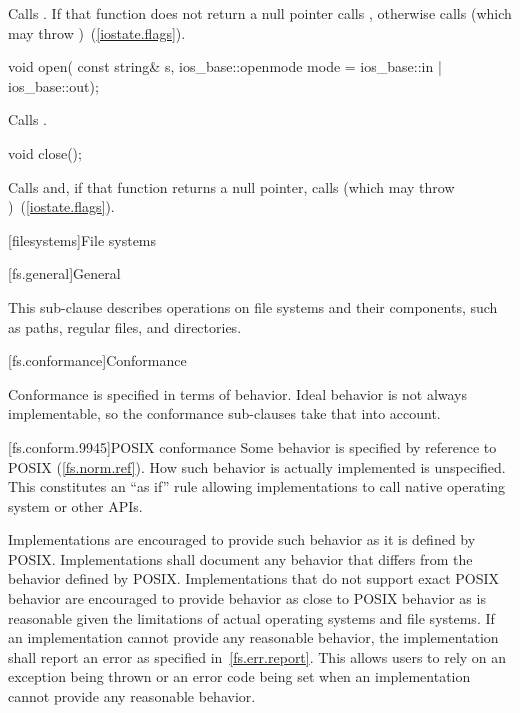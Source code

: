 \begin{itemdescr}
\pnum
\effects
Calls
.
If that function does not return a null pointer calls ,
otherwise calls
(which may throw
)~(\ref{iostate.flags}).
\end{itemdescr}

%
\begin{itemdecl}
void open(
  const string& s,
  ios_base::openmode mode = ios_base::in | ios_base::out);
\end{itemdecl}

\begin{itemdescr}
\pnum
\effects Calls .
\end{itemdescr}

%
\begin{itemdecl}
void close();
\end{itemdecl}

\begin{itemdescr}
\pnum
\effects
Calls
and, if that function
returns a null pointer,
calls
(which may throw
)~(\ref{iostate.flags}).
\end{itemdescr}

[filesystems]{File systems}

[fs.general]{General}

\pnum
This sub-clause describes operations on file systems and their components, such as paths,
regular files, and directories.

[fs.conformance]{Conformance}

\pnum
Conformance is specified in terms of behavior. Ideal behavior is not always
implementable, so the conformance sub-clauses take that into account.

[fs.conform.9945]{POSIX conformance}
\pnum
Some behavior is specified by reference to POSIX (\ref{fs.norm.ref}). How such behavior is actually implemented is unspecified.
\enternote This constitutes an ``as if'' rule allowing implementations
to call native
operating system or other APIs. \exitnote

\pnum
Implementations are encouraged to provide such behavior as it is defined by
POSIX. Implementations shall document any behavior that differs from the
behavior defined by POSIX. Implementations that do not support exact POSIX
behavior are encouraged to provide behavior as close to POSIX behavior as is reasonable given the
limitations of actual operating systems and file systems. If an implementation cannot provide any
reasonable behavior, the implementation shall report an error as specified in~\ref{fs.err.report}.
\enternote This allows users to rely on an exception being thrown or
an error code being set when an implementation cannot provide any reasonable
behavior.\exitnote

